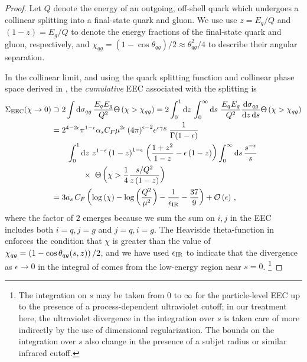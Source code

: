 \begin{proof}
    Let \(Q\) denote the energy of an outgoing, off-shell quark which undergoes a collinear splitting into a final-state quark and gluon.
    We use use \(z = E_q / Q\) and \((1-z) = E_g/Q\) to denote the energy fractions of the final-state quark and gluon, respectively, and \(\chi_{qg} = (1 - \cos\theta_{qg})/2 \approx \theta_{qg}^2/4\) to describe their angular separation.

    In the collinear limit, and using the quark splitting function and collinear phase space derived in , the \textit{cumulative} EEC associated with the splitting is
\begin{subequations}
\label{eq:eec_pair}
\begin{align}
    \Sigma_\text{EEC}(\chi \to 0)
    &\supset
    2\int \dd\sigma_{qg} \,
        \frac{E_q E_g}{Q^2}
        \Theta\le(\chi > \chi_{qg}\ri)
    =
    2\int_0^1 \dd z \,
    \int_0^\infty \dd s
        \,\,
        \frac{E_q E_g}{Q^2}
        \frac{\dd \sigma_{qg}}{\dd z\, \dd s}
        \Theta\le(\chi > \chi_{qg}\ri)
    \\
    \notag
    &=
    2^{4-2\epsilon} \pi^{1-\epsilon}
    \alpha_s C_F
    \mu^{2\epsilon}\,
    {(4\pi)}^{\epsilon-2}
    e^{\epsilon \gamma_E}
    \,
    \frac{1}{\Gamma(1-\epsilon)}
    \\
    \label{eq:eec-lim-b}
    &
    \qquad
    \int_0^1 \dd z
        \,\,
        z^{1-\epsilon}\le(1-z\ri)^{1-\epsilon}
        \,
        \le(
            \frac{1 + z^2}{1-z} - \epsilon \le(1-z\ri)
        \ri)
    \int_0^\infty \dd s
        \,
        \frac{s^{-\epsilon}}{s}
    \\
    \notag&
    \qquad\qquad
        \times\,\,\Theta\le(\chi > \frac{1}{4}\frac{s/Q^2}{z\le(1-z\ri)}\ri)
    \\
    \label{eq:eec_pair_final}
    &=
    3\ascf
    \le(
        \log\le(\chi\ri)
        -
        \log\le(\frac{Q^2}{\mu^2}\ri)
        -
        \frac{1}{\epsir}
        -
        \frac{37}{9}
    \ri)
    +
    \mc O\le(\epsilon\ri)
    \,,
\end{align}
\end{subequations}
where the factor of \(2\) emerges because we sum the sum on \(i, j\) in the EEC includes both \(i = q, j = g\) and \(j=q, i=g\).
%
The Heaviside theta-function in  enforces the condition that \(\chi\) is greater than the value of \(\chi_{qg} = \left(1 - \cos\theta_{qg}(s,z)\right)/2\), and we have used \(\epsilon_\text{IR}\) to indicate that the divergence as \(\epsilon \to 0\) in the integral of  comes from the low-energy region near \(s = 0\).%
\footnote{
    The integration on \(s\) may be taken from 0 to \(\infty\) for the particle-level EEC up to the presence of a process-dependent ultraviolet cutoff;
    in our treatment here, the ultraviolet divergence in the integration over \(s\) is taken care of more indirectly by the use of dimensional regularization.
    The bounds on the integration over \(s\) also change in the presence of a subjet radius or similar infrared cutoff.
}



\end{proof}
